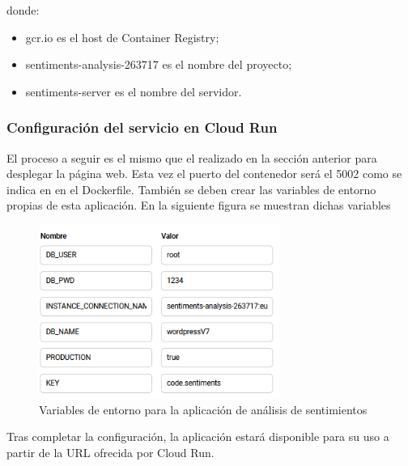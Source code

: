 donde:
\begin{itemize}
    \item gcr.io es el host de Container Registry;
    \item sentiments-analysis-263717 es el nombre del proyecto;
    \item sentiments-server es el nombre del servidor.
\end{itemize}

\subsubsection{Configuración del servicio en Cloud Run}

El proceso a seguir es el mismo que el realizado en la sección anterior para desplegar la página web. Esta vez el puerto del contenedor será el 5002 como se indica en en el Dockerfile. También se deben crear las variables de entorno propias de esta aplicación. En la siguiente figura se muestran dichas variables

\begin{figure}[ht]
    	\begin{center}
    		\includegraphics[width = 0.70\textwidth]{Figuras/variablesEntornoSentiments.PNG}
    	\end{center}
    	\caption{\label{fig:entornoSentiments} Variables de entorno para la aplicación de análisis de sentimientos}
\end{figure}

Tras completar la configuración, la aplicación estará disponible para su uso a partir de la URL ofrecida por Cloud Run.